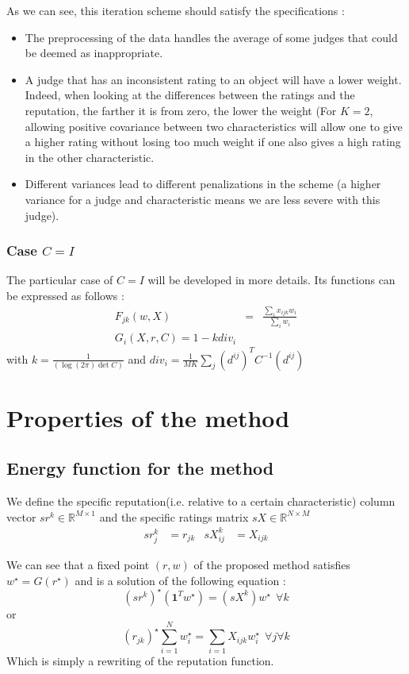 \documentclass[12pt,a4paper]{article}
\begin{document}
As we can see, this iteration scheme should satisfy the specifications : 
\begin{itemize}
\item The preprocessing of the data handles the average of some judges that could be deemed as inappropriate.
\item A judge that has an inconsistent rating to an object will have a lower weight. Indeed, when looking at the differences between the ratings and the reputation, the farther it is from zero, the lower the weight (For $K=2$, allowing positive covariance between two characteristics will allow one to give a higher rating without losing too much weight if one also gives a high rating in the other characteristic.
\item Different variances lead to different penalizations in the scheme (a higher variance for a judge and characteristic means we are less severe with this judge).
\end{itemize}
\subsubsection*{Case $C = I$}
The particular case of $C=I$ will be developed in more details. Its functions can be expressed as follows :
\begin{eqnarray}
F_{jk}(w,X) & = & \frac{\sum_{i}x_{ijk}w_{i}}{\sum_i w_{i}}\label{eq:rep}\\
G_{i}(X,r,C) = 1 -k div_i \label{eq:w8}
\end{eqnarray}
with $k= \frac{1}{(\log(2\pi ) \det C)}$ and $div_i =  \frac{1}{MK}\sum_{j} (d^{ij})^T C^{-1} (d^{ij})$\\


\section{Properties of the method}
\subsection{Energy function for the method}
We define the specific reputation(i.e. relative to a certain characteristic) column vector $ sr^k \in \mathbb{R}^{M\times 1}$ and the specific ratings matrix $sX \in \mathbb{R}^{N\times M}$
\begin{align*}
sr^k_{j} &= r_{jk} & sX^k_{ij} &= X_{ijk}
\end{align*}

We can see that a fixed point $(r,w)$ of the proposed method satisfies $ w^{\star} = G(r^{\star})$ and is a solution of the following equation :
$$ (sr^k)^{\star} (\mathbf{1}^Tw^{\star}) = (sX^k)w^{\star} \:\: \forall k$$
or 
$$ (r_{jk})^{\star} \sum_{i=1}^N w_i^{\star} = \sum_{i=1} X_{ijk} w_i^{\star} \:\: \forall j \forall k$$
Which is simply a rewriting of the reputation function.
\end{document}

